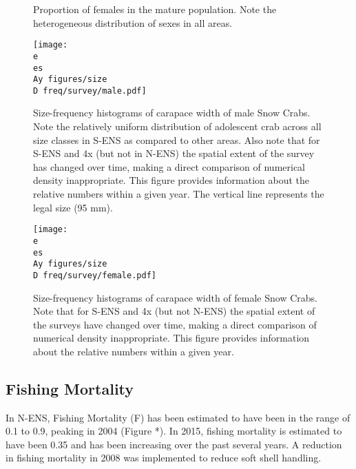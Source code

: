 \documentclass[paper=a4, fontsize=11pt]{article}
\newcommand{\D}{.}
\newcommand{\e}{\string~/ecomod_data/}   %
\newcommand{\es}{snowcrab/}
\newcommand{\Ay}{assessments/2015/}
\begin{document}
\begin{figure}[h]
  \centering
  \caption{Proportion of females in the mature population. Note the heterogeneous distribution of sexes in all areas.}
\end{figure}
\clearpage


\begin{figure}[h]
    \centering
    \texttt{[image: \\e \\es \\Ay figures/size\\D freq/survey/male.pdf]}
    \caption{Size-frequency histograms of carapace width of male Snow Crabs. Note the relatively uniform distribution of adolescent crab across all size classes in S-ENS as compared to other areas. Also note that for S-ENS and 4x (but not in N-ENS) the spatial extent of the survey has changed over time, making a direct comparison of numerical density inappropriate. This figure provides information about the relative numbers within a given year. The vertical line represents the legal size (95 mm).}
\end{figure}


\begin{figure}[h]
    \centering
    \texttt{[image: \\e \\es \\Ay figures/size\\D freq/survey/female.pdf]}
    \caption{Size-frequency histograms of carapace width of female Snow Crabs. Note that for S-ENS and 4x (but not N-ENS) the spatial extent of the surveys have changed over time, making a direct comparison of numerical density inappropriate. This figure provides information about the relative numbers within a given year.}
\end{figure}
\clearpage

\subsection{Fishing Mortality}

In N-ENS, Fishing Mortality (F) has been estimated to have been in the range of 0.1 to 0.9, peaking in 2004 (Figure *). In 2015, fishing mortality is estimated to have been 0.35 and has been increasing over the past several years. A reduction in fishing mortality in 2008 was implemented to reduce soft shell handling.\\
\end{document}
